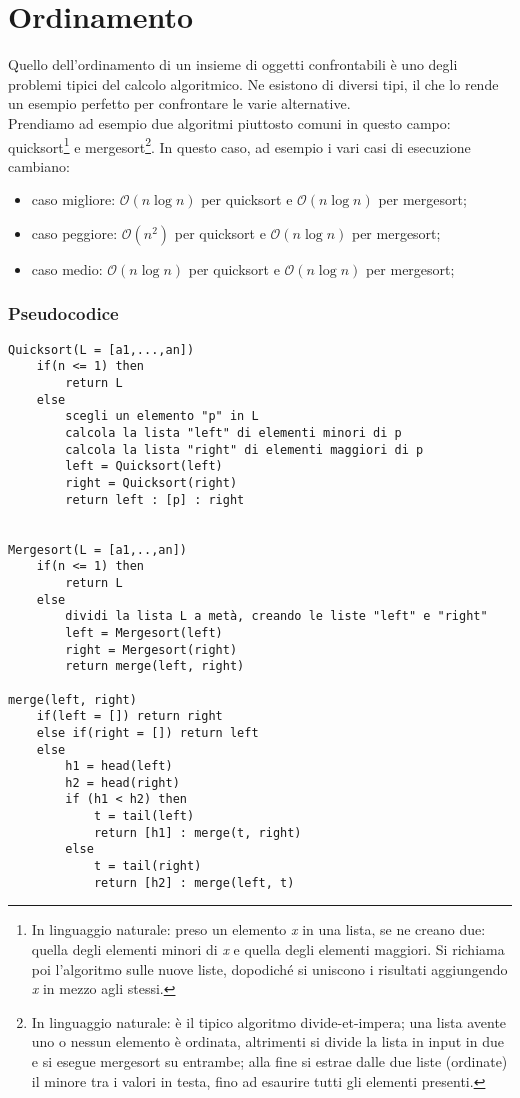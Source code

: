 \section{Ordinamento}
Quello dell'ordinamento di un insieme di oggetti confrontabili è uno degli problemi tipici del calcolo algoritmico. Ne esistono di diversi tipi, il che lo rende un esempio perfetto per confrontare le varie alternative.\\
Prendiamo ad esempio due algoritmi piuttosto comuni in questo campo: quicksort\footnote{In linguaggio naturale: preso un elemento \textit{x} in una lista, se ne creano due: quella degli elementi minori di \textit{x} e quella degli elementi maggiori. Si richiama poi l'algoritmo sulle nuove liste, dopodiché si uniscono i risultati aggiungendo \textit{x} in mezzo agli stessi.} e mergesort\footnote{In linguaggio naturale: è il tipico algoritmo divide-et-impera; una lista avente uno o nessun elemento è ordinata, altrimenti si divide la lista in input in due e si esegue mergesort su entrambe; alla fine si estrae dalle due liste (ordinate) il minore tra i valori in testa, fino ad esaurire tutti gli elementi presenti.}. In questo caso, ad esempio i vari casi di esecuzione cambiano:
\begin{itemize}
\item{caso migliore:  $\mathcal {O}(n \log {}n)$ per quicksort e  $\mathcal {O}(n \log {}n)$ per mergesort;}
\item{caso peggiore:  $\mathcal {O}(n^2)$ per quicksort e  $\mathcal {O}(n \log {}n)$ per mergesort;}
\item{caso medio:  $\mathcal {O}(n \log {}n)$ per quicksort e  $\mathcal {O}(n \log {}n)$ per mergesort;}
\end{itemize}
\subsubsection{Pseudocodice}
\begin{verbatim}
Quicksort(L = [a1,...,an])
    if(n <= 1) then
        return L
    else
        scegli un elemento "p" in L
	    calcola la lista "left" di elementi minori di p
	    calcola la lista "right" di elementi maggiori di p
	    left = Quicksort(left)
	    right = Quicksort(right)
	    return left : [p] : right


Mergesort(L = [a1,..,an])
    if(n <= 1) then
        return L
    else
        dividi la lista L a metà, creando le liste "left" e "right" 
        left = Mergesort(left)
        right = Mergesort(right)
        return merge(left, right)
        
merge(left, right)
    if(left = []) return right
    else if(right = []) return left
    else
        h1 = head(left)
        h2 = head(right)
        if (h1 < h2) then
            t = tail(left)
            return [h1] : merge(t, right)
        else
            t = tail(right)
            return [h2] : merge(left, t)
\end{verbatim}
